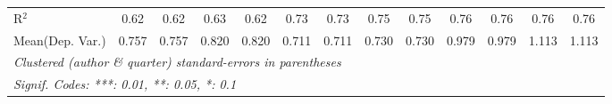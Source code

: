\begin{tabular}{lcccccccccccc}
   R$^2$                                    & 0.62         & 0.62          & 0.63         & 0.62          & 0.73    & 0.73    & 0.75    & 0.75    & 0.76    & 0.76        & 0.76    & 0.76\\  
Mean(Dep. Var.) & 0.757 & 0.757 & 0.820 & 0.820 & 0.711 & 0.711 & 0.730 & 0.730 & 0.979 & 0.979 & 1.113 & 1.113 \\
   \midrule \midrule
   \multicolumn{13}{l}{\emph{Clustered (author \& quarter) standard-errors in parentheses}}\\
   \multicolumn{13}{l}{\emph{Signif. Codes: ***: 0.01, **: 0.05, *: 0.1}}\\
\end{tabular}
\par\endgroup
